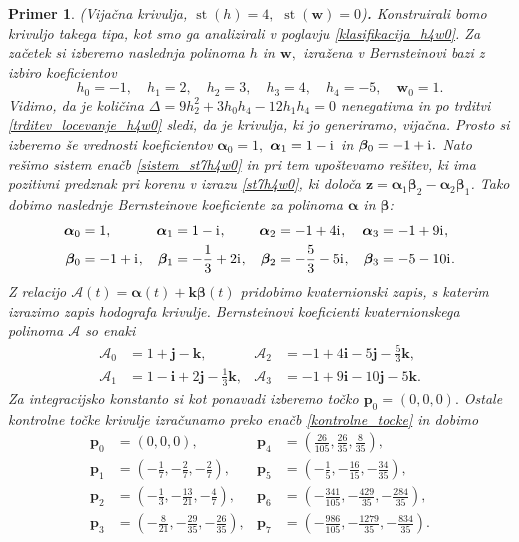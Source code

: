 \documentclass[12pt,a4paper,twoside]{article}
\newcommand{\iu}{\mathrm{i}\mkern1mu} %
\theoremstyle{definition} %
\theoremstyle{plain} %
\theoremstyle{primerstyle}
\newtheorem{primer}[definicija]{Primer}
\numberwithin{equation}{section}  %
\newcommand{\pV}{\mathbf{p}}
\newcommand{\iV}{\mathbf{i}}
\newcommand{\jV}{\mathbf{j}}
\newcommand{\kV}{\mathbf{k}}
\newcommand{\wV}{\mathbf{w}}
\newcommand{\zV}{\mathbf{z}}
\newcommand{\AQ}{\mathcal{A}}
\newcommand{\balpha}{\boldsymbol \alpha}
\newcommand{\bbeta}{\boldsymbol \beta}
\DeclareMathOperator{\st}{st}
\begin{document}
\begin{primer}
	\label{primer_h4w0_vijacna}
	\textnormal{ }(Vijačna krivulja, $\st(h)=4,$ $\st(\wV)=0$)\textbf{.}
	Konstruirali bomo krivuljo takega tipa, kot smo ga analizirali v poglavju \ref{klasifikacija_h4w0}. Za začetek si izberemo naslednja polinoma $h$ in $\wV,$ izražena v Bernsteinovi bazi z izbiro koeficientov
	\begin{equation*}
		h_0=-1,\quad h_1=2,\quad h_2=3,\quad h_3=4,\quad h_4=-5,\quad \wV_0=1.
	\end{equation*}
	Vidimo, da je količina $\Delta=9h_2^2+3h_0h_4-12h_1h_4=0$ nenegativna in po trditvi \ref{trditev_locevanje_h4w0} sledi, da je krivulja, ki jo generiramo, vijačna. Prosto si izberemo še vrednosti koeficientov $\balpha_0=1,$ $\balpha_1=1-\iu$ in $\bbeta_0=-1+\iu.$ Nato rešimo sistem enačb \eqref{sistem_st7h4w0} in pri tem upoštevamo rešitev, ki ima pozitivni predznak pri korenu v izrazu \eqref{st7h4w0}, ki določa $\zV=\balpha_1\bbeta_2-\balpha_2\bbeta_1$. Tako dobimo naslednje Bernsteinove koeficiente za polinoma $\balpha$ in $\bbeta$:
	\begin{align*}
		\balpha_0&=1,&\balpha_1&=1-\iu,&\balpha_2&=-1+4\iu,&\balpha_3&=-1+9\iu,\\
		\bbeta_0&=-1+\iu,&\bbeta_1&=-\frac{1}{3}+2\iu,&\bbeta_2&=-\frac{5}{3}-5\iu,&\bbeta_3&=-5-10\iu.
	\end{align*}
	Z relacijo $\AQ(t)=\balpha(t)+\kV\bbeta(t)$ pridobimo kvaternionski zapis, s katerim izrazimo zapis hodografa krivulje. Bernsteinovi koeficienti kvaternionskega polinoma $\AQ$ so enaki
	\begin{align*}
		\AQ_0&=1+\jV-\kV,&\AQ_2&=-1+4\iV-5\jV-\frac{5}{3}\kV,\\
		\AQ_1&=1-\iV+2\jV-\frac{1}{3}\kV,&\AQ_3&=-1+9\iV-10\jV-5\kV.
	\end{align*}
	Za integracijsko konstanto si kot ponavadi izberemo točko $\pV_0=(0,0,0).$ Ostale kontrolne točke krivulje izračunamo preko enačb \eqref{kontrolne_tocke} in dobimo
	\begin{align*}
		\pV_0&=(0,0,0),&\pV_4&=\left(\frac{26}{105},\frac{26}{35},\frac{8}{35}\right)\!,\\
		\pV_1&=\left(-\frac{1}{7},-\frac{2}{7},-\frac{2}{7}\right)\!,&\pV_5&=\left(-\frac{1}{5},-\frac{16}{15},-\frac{34}{35}\right)\!,\\
		\pV_2&=\left(-\frac{1}{3},-\frac{13}{21},-\frac{4}{7}\right)\!,&\pV_6&=\left(-\frac{341}{105},-\frac{429}{35},-\frac{284}{35}\right)\!,\\
		\pV_3&=\left(-\frac{8}{21},-\frac{29}{35},-\frac{26}{35}\right)\!,&\pV_7&=\left(-\frac{986}{105},-\frac{1279}{35},-\frac{834}{35}\right)\!.

\end{align*}
\end{primer}
\end{document}
